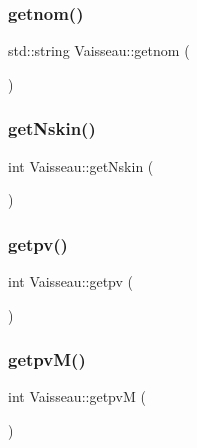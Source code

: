 \mbox{\label{class_vaisseau_acbe2e5af7beda381d21392d4eb539761}} 
\subsubsection{\texorpdfstring{getnom()}{getnom()}}
{\footnotesize\ttfamily std\+::string Vaisseau\+::getnom (\begin{DoxyParamCaption}{ }\end{DoxyParamCaption})}

\mbox{\label{class_vaisseau_aaecdafade1e84272e58cc97558f7c5c3}} 
\subsubsection{\texorpdfstring{get\+Nskin()}{getNskin()}}
{\footnotesize\ttfamily int Vaisseau\+::get\+Nskin (\begin{DoxyParamCaption}{ }\end{DoxyParamCaption})}

\mbox{\label{class_vaisseau_ae8e571f83be3f2bc1b961841f872265e}} 
\subsubsection{\texorpdfstring{getpv()}{getpv()}}
{\footnotesize\ttfamily int Vaisseau\+::getpv (\begin{DoxyParamCaption}{ }\end{DoxyParamCaption})}

\mbox{\label{class_vaisseau_aac552ebb8c5b199c0f0e38b1f1cd95af}} 
\subsubsection{\texorpdfstring{getpv\+M()}{getpvM()}}
{\footnotesize\ttfamily int Vaisseau\+::getpvM (\begin{DoxyParamCaption}{ }\end{DoxyParamCaption})}

